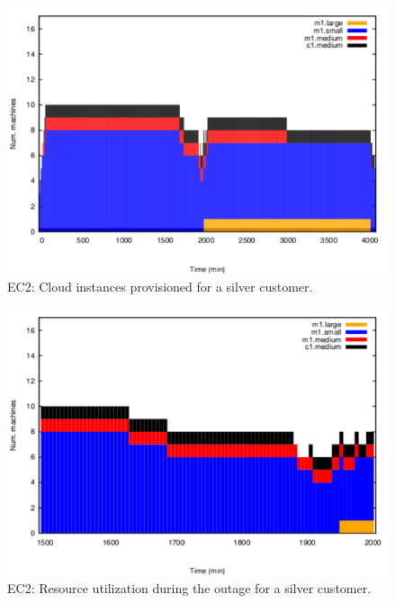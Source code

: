 \begin{figure}
  \begin{center}
    \includegraphics[width=.85\linewidth]{images/exps2011/medium/ec2/inst_type_machines.pdf}
  \end{center}
\vspace{-5mm}
  \caption{EC2: Cloud instances provisioned for a silver customer.}
  \label{mediumInstances}
\end{figure}

\begin{figure}
  \begin{center}
    \includegraphics[width=.85\linewidth]{images/exps2011/medium/ec2/inst_type_machines_filtered.pdf}
  \end{center}
\vspace{-5mm}
  \caption{EC2: Resource utilization during the outage for a silver customer.}
  \label{resOutage}
\end{figure}

